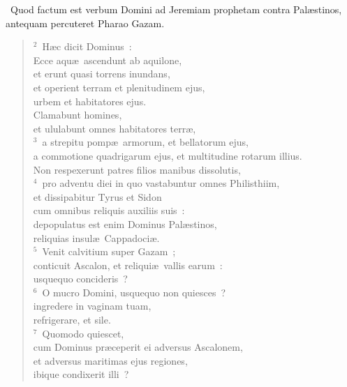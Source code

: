 ~Quod factum est verbum Domini ad Jeremiam prophetam contra Pal\ae stinos, antequam percuteret Pharao Gazam.
\begin{flushleft}\begin{verse}\vspace{6pt}${}^{2}$~H\ae c dicit Dominus~:\\ Ecce aqu\ae\ ascendunt ab aquilone,\\ et erunt quasi torrens inundans,\\ et operient terram et plenitudinem ejus,\\ urbem et habitatores ejus.\\ Clamabunt homines,\\ et ululabunt omnes habitatores terr\ae ,\\
${}^{3}$~a strepitu pomp\ae\ armorum, et bellatorum ejus,\\ a commotione quadrigarum ejus, et multitudine rotarum illius.\\ Non respexerunt patres filios manibus dissolutis,\\
${}^{4}$~pro adventu diei in quo vastabuntur omnes Philisthiim,\\ et dissipabitur Tyrus et Sidon\\ cum omnibus reliquis auxiliis suis~:\\ depopulatus est enim Dominus Pal\ae stinos,\\ reliquias insul\ae\ Cappadoci\ae .\\
${}^{5}$~Venit calvitium super Gazam~;\\ conticuit Ascalon, et reliqui\ae\ vallis earum~:\\ usquequo concideris~?\\
${}^{6}$~O mucro Domini, usquequo non quiesces~?\\ ingredere in vaginam tuam,\\ refrigerare, et sile.\\
${}^{7}$~Quomodo quiescet,\\ cum Dominus pr\ae ceperit ei adversus Ascalonem,\\ et adversus maritimas ejus regiones,\\ ibique condixerit illi~?\end{verse}\end{flushleft}


